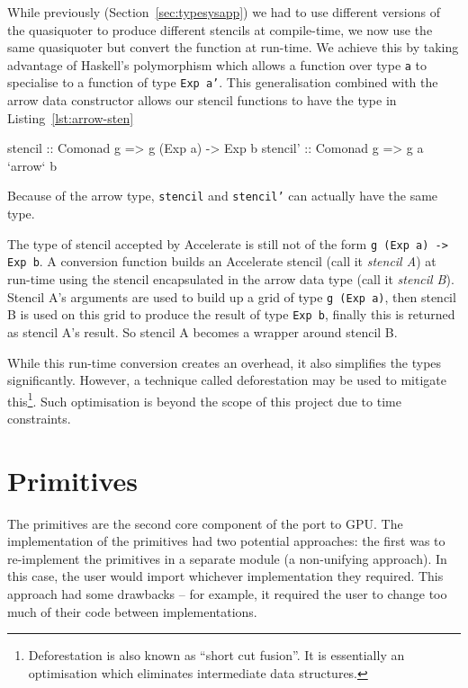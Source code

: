 \documentclass[
    12pt,
    a4paper,
    twoside,
    openright,
    ]{scrbook}
\begin{document}
While previously (Section~\ref{sec:typesysapp}) we had to use different versions
of the quasiquoter to produce different stencils at compile-time, we now use the
same quasiquoter but convert the function at run-time. We achieve this by taking
advantage of Haskell's polymorphism which allows a function over type \texttt{a}
to specialise to a function of type \texttt{Exp a'}. This generalisation
combined with the arrow data constructor allows our stencil functions to have
the type in Listing~\ref{lst:arrow-sten}

\begin{hflisting}[label={lst:arrow-sten}, caption=Here we see the type the
  stencil must have in Accelerate (\texttt{stencil}) and the type we can
  generalise to using the \texttt{arrow} type (\texttt{stencil'}).]
stencil :: Comonad g => g (Exp a) -> Exp b
stencil' :: Comonad g => g a `arrow` b
\end{hflisting}

Because of the arrow type, \texttt{stencil} and \texttt{stencil'} can
actually have the same type.

The type of stencil accepted by Accelerate is still not of the form \texttt{g
  (Exp a) -\textgreater{} Exp b}. A conversion function builds an Accelerate
stencil (call it \emph{stencil A}) at run-time using the stencil encapsulated in
the arrow data type (call it \emph{stencil B}). Stencil A's arguments are used
to build up a grid of type \texttt{g (Exp a)}, then stencil B is used on this
grid to produce the result of type \texttt{Exp b}, finally this is returned as
stencil A's result. So stencil A becomes a wrapper around stencil B.

While this run-time conversion creates an overhead, it also simplifies the types
significantly. However, a technique called deforestation may be used to mitigate
this\footnote{Deforestation is also known as ``short cut fusion''. It is
  essentially an optimisation which eliminates intermediate data
  structures.}. Such optimisation is beyond the scope of this project due to
time constraints.

\section{Primitives}
\label{sec:prims}

The primitives are the second core component of the port to GPU. The
implementation of the primitives had two potential approaches: the first was to
re-implement the primitives in a separate module (a non-unifying approach). In
this case, the user would import whichever implementation they required. This
approach had some drawbacks -- for example, it required the user to change too
much of their code between implementations.
\end{document}
